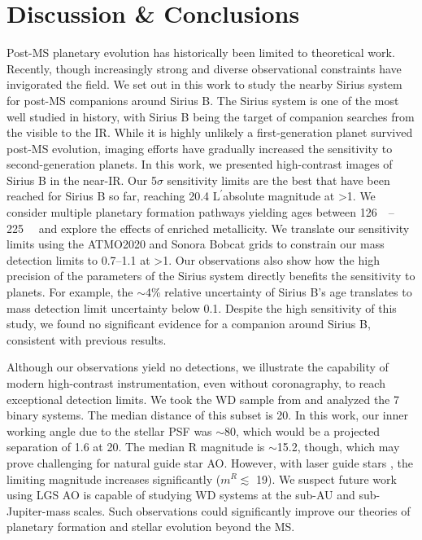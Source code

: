 \documentclass[twocolumn]{aastex631}
\newcommand\Lp{$\mathrm{L}^\prime$}
\begin{document}
\section{Discussion \& Conclusions}\label{sec:conclusion}

Post-MS planetary evolution has historically been limited to theoretical work. Recently, though increasingly strong and diverse observational constraints have invigorated the field. We set out in this work to study the nearby Sirius system for post-MS companions around Sirius B. The Sirius system is one of the most well studied in history, with Sirius B being the target of companion searches from the visible to the IR. While it is highly unlikely a first-generation planet survived post-MS evolution, imaging efforts have gradually increased the sensitivity to second-generation planets. In this work, we presented high-contrast images of Sirius B in the near-IR. Our 5$\sigma$ sensitivity limits are the best that have been reached for Sirius B so far, reaching \num{20.4} \Lp absolute magnitude at \textgreater\qty{1}{\au}. We consider multiple planetary formation pathways yielding ages between \qtyrange{126}{225}{\mega\year} and explore the effects of enriched metallicity. We translate our sensitivity limits using the ATMO2020 and Sonora Bobcat grids to constrain our mass detection limits to \qtyrange{0.7}{1.1}{\jupitermass} at \textgreater\qty{1}{\au}. Our observations also show how the high precision of the parameters of the Sirius system directly benefits the sensitivity to planets. For example, the $\sim$4\% relative uncertainty of Sirius B's age translates to mass detection limit uncertainty below \qty{0.1}{\jupitermass}. Despite the high sensitivity of this study, we found no significant evidence for a companion around Sirius B, consistent with previous results.

Although our observations yield no detections, we illustrate the capability of modern high-contrast instrumentation, even without coronagraphy, to reach exceptional detection limits. We took the WD sample from \citet{holberg25ParsecLocal2016} and analyzed the 7 binary systems. The median distance of this subset is \qty{20}{\parsec}. In this work, our inner working angle due to the stellar PSF was $\sim$\qty{80}{\milliarcsecond}, which would be a projected separation of \qty{1.6}{\au} at \qty{20}{\parsec}. The median R magnitude is $\sim$\num{15.2}, though, which may prove challenging for natural guide star AO. However, with laser guide stars \citep[LGS; e.g.,][]{vandamKeckObservatoryLaser2006,baranecRoboAO2FacilityRapid2018}, the limiting magnitude increases significantly ($m^R\lesssim$ \num{19}). We suspect future work using LGS AO is capable of studying WD systems at the sub-AU and sub-Jupiter-mass scales. Such observations could significantly improve our theories of planetary formation and stellar evolution beyond the MS.
\end{document}
